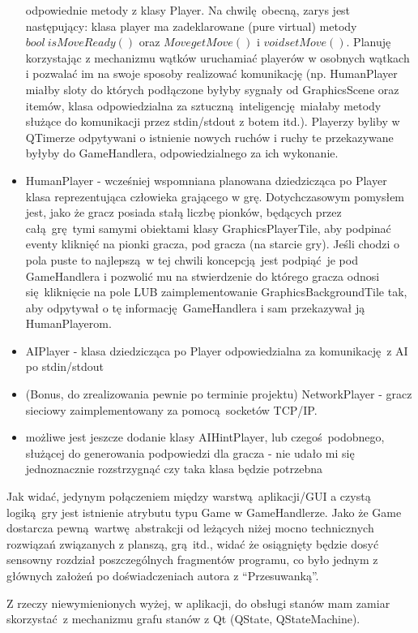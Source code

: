 \documentclass[a4paper,12pt]{article}
\begin{document}
\begin{itemize}
 odpowiednie metody z klasy Player. Na chwilę obecną, zarys jest następujący: klasa player ma zadeklarowane (pure virtual) metody $bool ~ isMoveReady()$
 oraz $Move getMove()$ i $void setMove()$. Planuję korzystając z mechanizmu wątków uruchamiać playerów w osobnych wątkach i pozwalać im na swoje
 sposoby realizować komunikację (np. HumanPlayer miałby sloty do których podłączone byłyby sygnały od GraphicsScene oraz itemów, klasa odpowiedzialna
 za sztuczną inteligencję miałaby metody służące do komunikacji przez stdin/stdout z botem itd.). Playerzy byliby w QTimerze odpytywani o istnienie
 nowych ruchów i ruchy te przekazywane byłyby do GameHandlera, odpowiedzialnego za ich wykonanie.
 \item HumanPlayer - wcześniej wspomniana planowana dziedzicząca po Player klasa reprezentująca człowieka grającego w grę. Dotychczasowym pomysłem jest,
 jako że gracz posiada stałą liczbę pionków, będących przez całą grę tymi samymi obiektami klasy GraphicsPlayerTile, aby podpinać eventy kliknięć
 na pionki gracza, pod gracza (na starcie gry). Jeśli chodzi o pola puste to najlepszą w tej chwili koncepcją jest podpiąć je pod GameHandlera i
 pozwolić mu na stwierdzenie do którego gracza odnosi się kliknięcie na pole LUB zaimplementowanie GraphicsBackgroundTile tak, aby odpytywał o tę
 informację GameHandlera i sam przekazywał ją HumanPlayerom.
 \item AIPlayer - klasa dziedzicząca po Player odpowiedzialna za komunikację z AI po stdin/stdout
 \item(Bonus, do zrealizowania pewnie po terminie projektu) NetworkPlayer - gracz sieciowy zaimplementowany za pomocą socketów TCP/IP.
 \item możliwe jest jeszcze dodanie klasy AIHintPlayer, lub czegoś podobnego, służącej do generowania podpowiedzi dla gracza - nie udało mi się
 jednoznacznie rozstrzygnąć czy taka klasa będzie potrzebna
\end{itemize}
Jak widać, jedynym połączeniem między warstwą aplikacji/GUI a czystą logiką gry jest istnienie atrybutu typu Game w GameHandlerze. Jako że Game
dostarcza pewną wartwę abstrakcji od leżących niżej mocno technicznych rozwiązań związanych z planszą, grą itd., widać że osiągnięty będzie dosyć
sensowny rozdział poszczególnych fragmentów programu, co było jednym z głównych założeń po doświadczeniach autora z ``Przesuwanką''.

Z rzeczy niewymienionych wyżej, w aplikacji, do obsługi stanów mam zamiar skorzystać z mechanizmu grafu stanów z Qt (QState, QStateMachine). 
\end{document}
